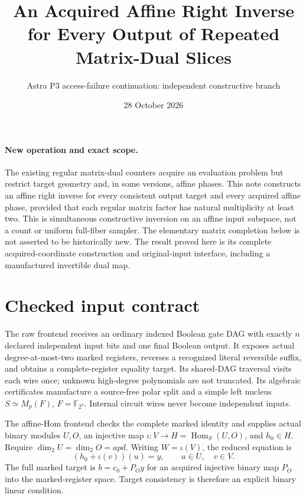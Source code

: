 \documentclass[11pt]{article}
\title{An Acquired Affine Right Inverse for Every Output of Repeated Matrix-Dual Slices}
\author{Astra P3 access-failure continuation: independent constructive branch}
\date{28 October 2026}
\newcommand{\F}{\mathbb F}
\newcommand{\Hom}{\operatorname{Hom}}
\begin{document}
\maketitle

\paragraph{New operation and exact scope.}
The existing regular matrix-dual counters acquire an evaluation problem but
restrict target geometry and, in some versions, affine phases. This note
constructs an affine right inverse for every consistent output target and
every acquired affine phase, provided that each regular matrix factor has
natural multiplicity at least two. This is simultaneous constructive
inversion on an affine input subspace, not a count or uniform full-fiber
sampler. The elementary matrix completion below is not asserted to be
historically new. The result proved here is its complete acquired-coordinate
construction and original-input interface, including a manufactured
invertible dual map.

\section{Checked input contract}

The raw frontend receives an ordinary indexed Boolean gate DAG with exactly
$n$ declared independent input bits and one final Boolean output. It exposes
actual degree-at-most-two marked registers, reverses a recognized literal
reversible suffix, and obtains a complete-register equality target. Its
shared-DAG traversal visits each wire once; unknown high-degree polynomials
are not truncated. Its algebraic certificates manufacture a source-free
polar split and a simple left nucleus $S\simeq M_p(F)$, $F=\F_{2^a}$.
Internal circuit wires never become independent inputs.

The affine-Hom frontend checks the complete marked identity and supplies
actual binary modules $U,O$, an injective map $\iota:V\to H=\Hom_S(U,O)$,
and $h_0\in H$. Require $\dim_2U=\dim_2O=apd$.
Writing $W=\iota(V)$, the reduced equation is
\begin{equation}\label{eq:eval}
 (h_0+\iota(v))(u)=y,\qquad u\in U,\quad v\in V.
\end{equation}
The full marked target is $b=c_0+P_Oy$ for an acquired injective binary map
$P_O$ into the marked-register space. Target consistency is therefore an
explicit binary linear condition.
\end{document}
